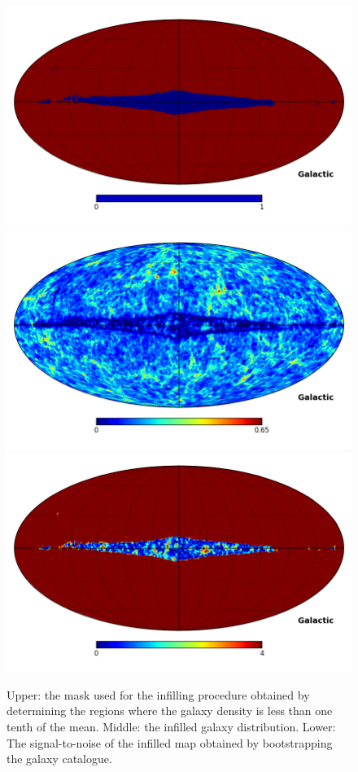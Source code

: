 \documentclass[useAMS,usenatbib]{mn2e}
\begin{document}
\begin{figure}
  \includegraphics[width=\columnwidth]{test_mask}
  \includegraphics[width=\columnwidth]{combined}
  \includegraphics[width=\columnwidth]{snr}
  \caption{Upper: the mask used for the infilling procedure obtained
    by determining the regions where the galaxy density is less than
    one tenth of the mean.  Middle: the infilled galaxy
    distribution. Lower: The signal-to-noise of the infilled map
    obtained by bootstrapping the galaxy catalogue.}
  \label{fig:infilling}
\end{figure}
\end{document}

